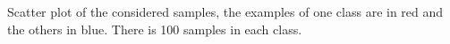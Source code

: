 Scatter plot of the considered samples, the examples of one class are in red and the others in blue. There is 100 samples in each class.